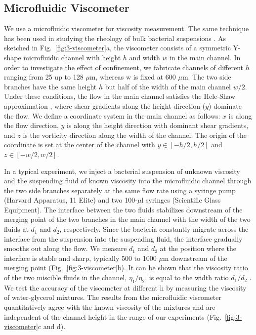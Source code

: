 \subsection{Microfluidic Viscometer}
We use a microfluidic viscometer for viscosity measurement. The same technique has been used in studying the rheology of bulk bacterial suspensions \cite{Gachelin2013}. As sketched
in Fig.~\ref{fig:3-viscometer}a, the viscometer consists of a symmetric Y-shape microfluidic channel with height $h$ and width $w$ in the main channel. In order to investigate the effect of confinement, we
fabricate channels of different $h$ ranging from 25 up to 128 $\mu$m, whereas w is fixed at 600 $\mu$m. The two side branches have the same height $h$ but half of the width of the main
channel $w/2$. Under these conditions, the flow in the main channel satisfies the Hele-Shaw approximation \cite{Lamb1932}, where shear gradients along the height direction ($y$) dominate the flow. We define a coordinate system in the main channel as follows: $x$ is along the flow direction, $y$ is along the height direction with dominant shear gradients, and $z$ is the vorticity direction along the width of the channel.
The origin of the coordinate is set at the center of the channel with $y \in [-h/2, h/2]$ and $z \in [-w/2, w/2]$.

In a typical experiment, we inject a bacterial suspension of unknown viscosity and the suspending fluid of known viscosity into the microfluidic channel through the two side branches separately at the same flow rate using a syringe pump (Harvard Apparatus, 11 Elite) and two 100-$\mu$l syringes (Scientific Glass Equipment). The interface between the two fluids stabilizes downstream of the merging point of the two branches in the main channel with the width of the two fluids at $d_1$ and $d_2$, respectively.
Since the bacteria constantly migrate across the interface from the suspension into the suspending fluid, the interface gradually smooths out along the flow. We measure $d_1$ and $d_2$ at the position where the interface is stable and sharp, typically 500 to 1000 $\mu$m downstream of the merging point (Fig.~\ref{fig:3-viscometer}b).
It can be shown that the viscosity ratio of the two miscible fluids in the channel, $\eta_1/\eta_2$, is equal to the width ratio $d_1/d_2$ \cite{Guillot2006, Nghe2010}. We test the accuracy of the viscometer at different h by measuring the viscosity of water-glycerol mixtures.
The results from the microfluidic viscometer quantitatively agree with the known viscosity of the mixtures and are independent of the channel height in the range of our experiments (Fig.~\ref{fig:3-viscometer}c and d).

